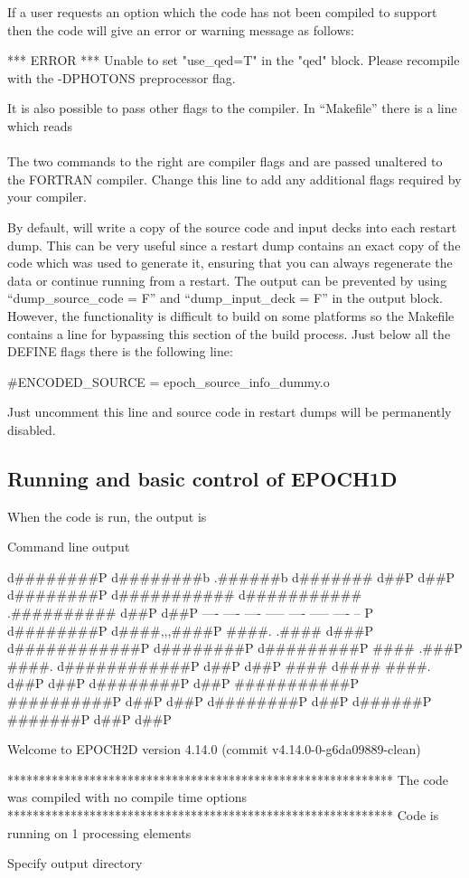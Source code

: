 If a user requests an option which the code has not been compiled to support
then the code will give an error or warning message as follows:
\begin{boxverbatim}
 *** ERROR ***
 Unable to set "use_qed=T" in the "qed" block.
 Please recompile with the -DPHOTONS preprocessor flag.
\end{boxverbatim}
It is also possible to pass other flags to the compiler. In ``Makefile'' there
is a line which reads\\
\indent{}\\
The two commands to the right are compiler flags and are passed unaltered to
the FORTRAN compiler. Change this line to add any additional flags required by
your compiler.

By default, {\EPOCH} will write a copy of the source code and input decks
into each restart dump. This can be very useful since a restart dump contains
an exact copy of the code which was used to generate it, ensuring that you
can always regenerate the data or continue running from a restart.
The output can be prevented by using ``dump\_source\_code = F'' and
``dump\_input\_deck = F'' in the output block.
However, the functionality is difficult to build on some platforms so
the Makefile contains a line for bypassing this section of the build
process. Just below all the DEFINE flags there is the following line:
\begin{boxverbatim}
#ENCODED_SOURCE = epoch_source_info_dummy.o
\end{boxverbatim}
Just uncomment this line and source code in restart dumps will be permanently
disabled.


\subsection{\texorpdfstring
  {Running {\EPOCH} and basic control of EPOCH1D}
  {Running {EPOCH} and basic control of EPOCH1D}}
When the code is run, the output is
{\samepage
\begin{lboxverbatim}{Command line output}

        d########P  d########b        .######b          d#######  d##P      d##P
       d########P  d###########    d###########     .##########  d##P      d##P
      ----        ----     ----  -----     ----   -----         ----      -- P
     d########P  d####,,,####P ####.      .#### d###P          d############P
    d########P  d#########P   ####       .###P ####.          d############P
   d##P        d##P           ####     d####   ####.         d##P      d##P
  d########P  d##P            ###########P     ##########P  d##P      d##P
 d########P  d##P              d######P          #######P  d##P      d##P

 Welcome to EPOCH2D version 4.14.0   (commit v4.14.0-0-g6da09889-clean)

 *************************************************************
 The code was compiled with no compile time options
 *************************************************************
 Code is running on 1 processing elements

 Specify output directory
\end{lboxverbatim}
}

